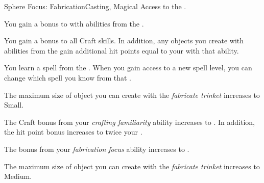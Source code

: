     \begin{feat}{Sphere Focus: Fabrication}{Casting, Magical}
        \featpre Access to the  .

         You gain a  bonus to  with abilities from the  .

         You gain a  bonus to all Craft skills.
        In addition, any objects you create with abilities from the   gain additional hit points equal to your  with that ability.

         You learn a spell from the  .
        When you gain access to a new spell level, you can change which spell you know from that .

         The maximum size of object you can create with the \textit{fabricate trinket}  increases to Small.

         The Craft bonus from your \textit{crafting familiarity} ability increases to .
        In addition, the hit point bonus increases to twice your .

         The bonus from your \textit{fabrication focus} ability increases to .

         The maximum size of object you can create with the \textit{fabricate trinket}  increases to Medium.
    \end{feat}

